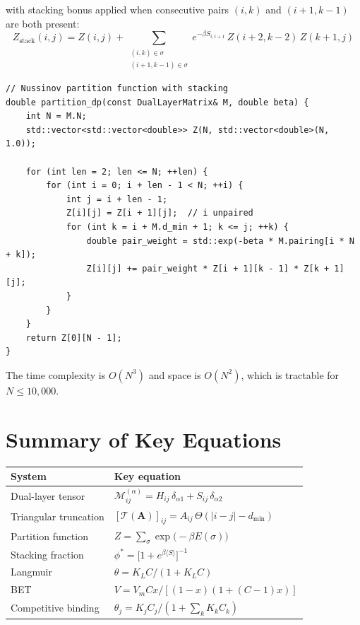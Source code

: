 \documentclass[11pt]{article}
\begin{document}
with stacking bonus applied when consecutive pairs
$(i, k)$ and $(i+1, k-1)$ are both present:
\begin{equation}
  Z_{\text{stack}}(i, j) = Z(i, j)
  + \sum_{\substack{(i,k) \in \sigma \\ (i+1,k-1) \in \sigma}}
    e^{-\beta S_{i,i+1}}\, Z(i+2, k-2)\, Z(k+1, j)
\end{equation}

\begin{lstlisting}
// Nussinov partition function with stacking
double partition_dp(const DualLayerMatrix& M, double beta) {
    int N = M.N;
    std::vector<std::vector<double>> Z(N, std::vector<double>(N, 1.0));

    for (int len = 2; len <= N; ++len) {
        for (int i = 0; i + len - 1 < N; ++i) {
            int j = i + len - 1;
            Z[i][j] = Z[i + 1][j];  // i unpaired
            for (int k = i + M.d_min + 1; k <= j; ++k) {
                double pair_weight = std::exp(-beta * M.pairing[i * N + k]);
                Z[i][j] += pair_weight * Z[i + 1][k - 1] * Z[k + 1][j];
            }
        }
    }
    return Z[0][N - 1];
}
\end{lstlisting}

The time complexity is $O(N^3)$ and space is $O(N^2)$, which is
tractable for $N \leq 10{,}000$.

\section{Summary of Key Equations}

\begin{center}
\renewcommand{\arraystretch}{1.8}
\begin{tabular}{lp{8cm}}
\toprule
\textbf{System} & \textbf{Key equation} \\
\midrule
Dual-layer tensor &
  $\mathcal{M}_{ij}^{(\alpha)} = H_{ij}\,\delta_{\alpha 1}
   + S_{ij}\,\delta_{\alpha 2}$ \\
Triangular truncation &
  $[\mathcal{T}(\mathbf{A})]_{ij} = A_{ij}\,\Theta(|i-j| - d_{\min})$ \\
Partition function &
  $Z = \sum_{\sigma} \exp\!\bigl(-\beta E(\sigma)\bigr)$ \\
Stacking fraction &
  $\phi^{*} = \bigl[1 + e^{\beta \langle S \rangle}\bigr]^{-1}$ \\
Langmuir &
  $\theta = K_L C / (1 + K_L C)$ \\
BET &
  $V = V_m C x / [(1-x)(1 + (C-1)x)]$ \\
Competitive binding &
  $\theta_j = K_j C_j / (1 + \sum_k K_k C_k)$ \\
\bottomrule
\end{tabular}
\end{center}
\end{document}
